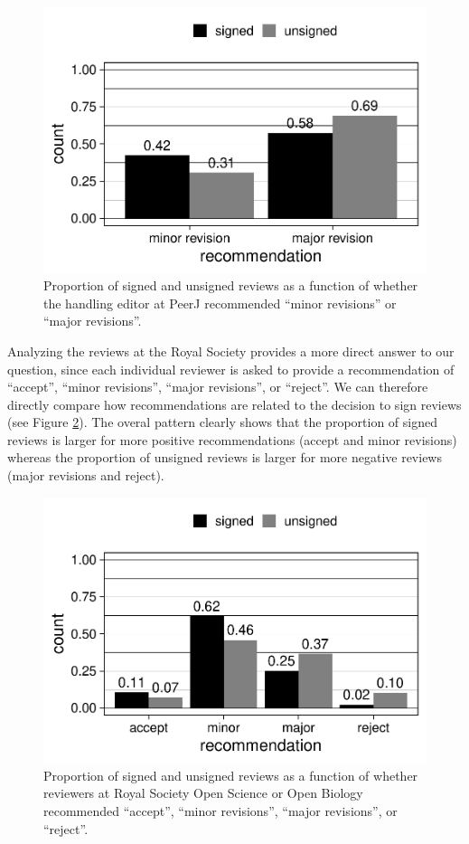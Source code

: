 \documentclass[,jou, a4paper,floatsintext]{apa6}
\begin{document}
\begin{figure}
\centering
\includegraphics{open_peer_review_files/figure-latex/PeerJrec-1.pdf}
\caption{\label{fig:PeerJrec}Proportion of signed and unsigned reviews as a function of whether the handling editor at PeerJ recommended \enquote{minor revisions} or \enquote{major revisions}.}
\end{figure}

Analyzing the reviews at the Royal Society provides a more direct answer to our question, since each individual reviewer is asked to provide a recommendation of \enquote{accept}, \enquote{minor revisions}, \enquote{major revisions}, or \enquote{reject}. We can therefore directly compare how recommendations are related to the decision to sign reviews (see Figure \ref{fig:TRSrec}). The overal pattern clearly shows that the proportion of signed reviews is larger for more positive recommendations (accept and minor revisions) whereas the proportion of unsigned reviews is larger for more negative reviews (major revisions and reject).

\begin{figure}
\centering
\includegraphics{open_peer_review_files/figure-latex/TRSrec-1.pdf}
\caption{\label{fig:TRSrec}Proportion of signed and unsigned reviews as a function of whether reviewers at Royal Society Open Science or Open Biology recommended \enquote{accept}, \enquote{minor revisions}, \enquote{major revisions}, or \enquote{reject}.}
\end{figure}
\end{document}
